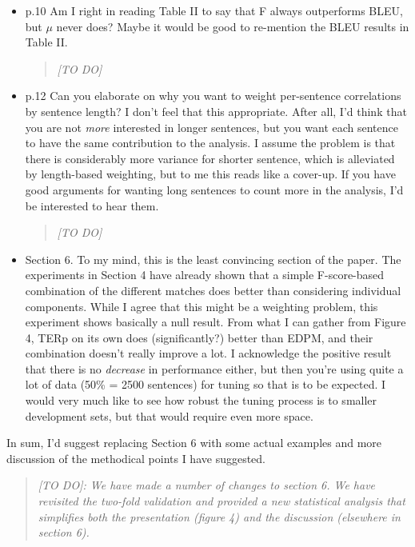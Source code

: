 \documentclass[letterpaper,12pt]{article}
\newenvironment{response}
{\begin{quotation} \it}
  {\end{quotation}}
\begin{document}
\begin{itemize}
\item  p.10 Am I right in reading Table II to say that F always
  outperforms BLEU, but $\mu$ never does? Maybe it would be good to
  re-mention the BLEU results in Table II.
  \begin{response}
    [TO DO]
  \end{response}

\item  p.12 Can you elaborate on why you want to weight per-sentence
  correlations by sentence length? I don't feel that this
  appropriate. After all, I'd think that you are not \emph{more}
  interested in longer sentences, but you want each sentence to have
  the same contribution to the analysis. I assume the problem is that
  there is considerably more variance for shorter sentence, which is
  alleviated by length-based weighting, but to me this reads like a
  cover-up. If you have good arguments for wanting long sentences to
  count more in the analysis, I'd be interested to hear them.
  \begin{response}
    [TO DO]
  \end{response}

\item  Section 6. To my mind, this is the least convincing section of the
  paper. The experiments in Section 4 have already shown that a simple
  F-score-based combination of the different matches does better than
  considering individual components. While I agree that this might be
  a weighting problem, this experiment shows basically a null result.
  From what I can gather from Figure 4, TERp on its own does
  (significantly?) better than EDPM, and their combination doesn't
  really improve a lot. I acknowledge the positive result that there
  is no \emph{decrease} in performance either, but then you're using
  quite a lot of data (50\% = 2500 sentences) for tuning so that is to
  be expected. I would very much like to see how robust the tuning
  process is to smaller development sets, but that would require even
  more space.
\end{itemize}
In sum, I'd suggest replacing Section 6 with some actual examples and
more discussion of the methodical points I have suggested.
\begin{response}
  [TO DO]: We have made a number of changes to section 6.  We have
  revisited the two-fold validation and provided a new statistical
  analysis that simplifies both the presentation (figure 4) and the
  discussion (elsewhere in section 6).
\end{response}
\end{document}
